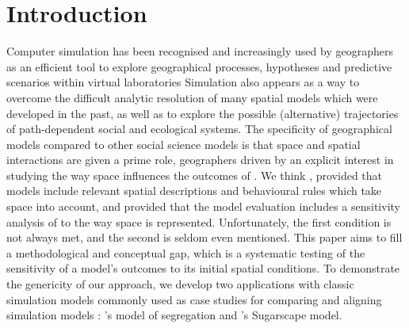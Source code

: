 \documentclass[preprint,5p,times,twocolumn,authoryear]{elsarticle}
\begin{document}
%




\section{Introduction}

Computer simulation has been recognised and increasingly used by geographers as an efficient tool to explore geographical processes, hypotheses and predictive scenarios within virtual laboratories \citep{batty1971modelling, batty2007model, carley1999generating, Quesneletal2009} Simulation also appears as a way to overcome the difficult analytic resolution of many spatial models which were developed in the past, as well as to explore the possible (alternative) trajectories of path-dependent social and ecological systems. The specificity of geographical models compared to other social science models is that space and spatial interactions are given a prime role, geographers  driven by an explicit interest in studying the way space influences the outcomes of . We think , provided that models include relevant spatial descriptions and behavioural rules which take space into account, and provided that the model evaluation includes a sensitivity analysis of  to the way space is represented. Unfortunately, the first condition is not always met, and the second is seldom even mentioned. This paper aims to fill a methodological and conceptual gap, which is a systematic testing of the sensitivity of a model's outcomes to its initial spatial conditions. To demonstrate the genericity of our approach, we develop two applications with classic simulation models commonly used as case studies for comparing and aligning simulation models \citep{Axtelletal1996, wilensky2007making}: \citet{schelling1971dynamic}'s model of segregation and \citet{EpsteinAxtell1996}'s Sugarscape model.\\
\end{document}
